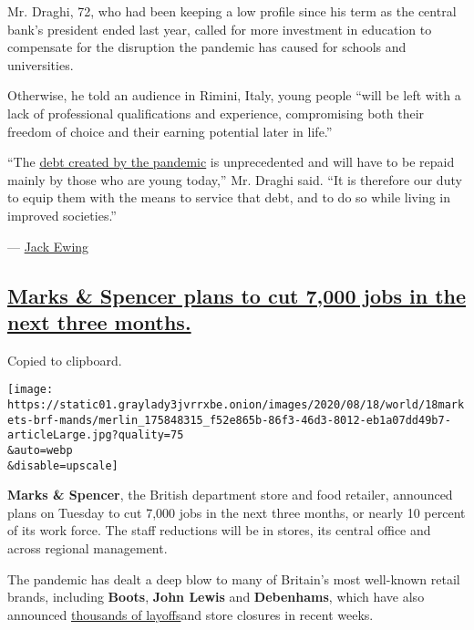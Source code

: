 Mr. Draghi, 72, who had been keeping a low profile since his term as the
central bank's president ended last year, called for more investment in
education to compensate for the disruption the pandemic has caused for
schools and universities.

Otherwise, he told an audience in Rimini, Italy, young people ``will be
left with a lack of professional qualifications and experience,
compromising both their freedom of choice and their earning potential
later in life.''

``The
\href{https://www.nytimes3xbfgragh.onion/2020/06/04/business/europe-coronavirus-economic-support.html}{debt
created by the pandemic} is unprecedented and will have to be repaid
mainly by those who are young today,'' Mr. Draghi said. ``It is
therefore our duty to equip them with the means to service that debt,
and to do so while living in improved societies.''

--- \href{https://www.nytimes3xbfgragh.onion/by/jack-ewing}{Jack Ewing}

\hypertarget{marks--spencer-plans-to-cut-7000-jobs-in-the-next-three-months}{%
\subsection{\texorpdfstring{\protect\hyperlink{marks-spencer-plans-to-cut-7000-jobs-in-the-next-three-months}{Marks
\& Spencer plans to cut 7,000 jobs in the next three
months.}}{Marks \& Spencer plans to cut 7,000 jobs in the next three months.}}\label{marks--spencer-plans-to-cut-7000-jobs-in-the-next-three-months}}

Copied to clipboard.

\texttt{[image: https://static01.graylady3jvrrxbe.onion/images/2020/08/18/world/18markets-brf-mands/merlin\_175848315\_f52e865b-86f3-46d3-8012-eb1a07dd49b7-articleLarge.jpg?quality=75\\\&auto=webp\\\&disable=upscale]}

\textbf{Marks \& Spencer}, the British department store and food
retailer, announced plans on Tuesday to cut 7,000 jobs in the next three
months, or nearly 10 percent of its work force. The staff reductions
will be in stores, its central office and across regional management.

The pandemic has dealt a deep blow to many of Britain's most well-known
retail brands, including \textbf{Boots}, \textbf{John Lewis} and
\textbf{Debenhams}, which have also announced
\href{https://www.bbc.co.uk/news/business-53348519}{thousands of
layoffs}and store closures in recent weeks.

